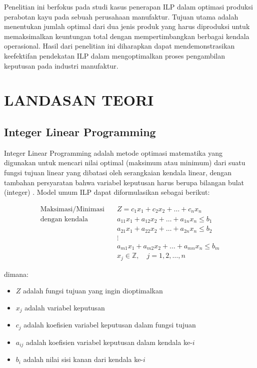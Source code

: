 \documentclass[twocolumn]{article}
\begin{document}
Penelitian ini berfokus pada studi kasus penerapan ILP dalam optimasi produksi perabotan kayu pada sebuah perusahaan manufaktur. Tujuan utama adalah menentukan jumlah optimal dari dua jenis produk yang harus diproduksi untuk memaksimalkan keuntungan total dengan mempertimbangkan berbagai kendala operasional. Hasil dari penelitian ini diharapkan dapat mendemonstrasikan keefektifan pendekatan ILP dalam mengoptimalkan proses pengambilan keputusan pada industri manufaktur.

\section{LANDASAN TEORI}
\subsection{Integer Linear Programming}
Integer Linear Programming adalah metode optimasi matematika yang digunakan untuk mencari nilai optimal (maksimum atau minimum) dari suatu fungsi tujuan linear yang dibatasi oleh serangkaian kendala linear, dengan tambahan persyaratan bahwa variabel keputusan harus berupa bilangan bulat (integer) \cite{hillier2012introduction}. Model umum ILP dapat diformulasikan sebagai berikut:

\begin{align}
\text{Maksimasi/Minimasi} \quad & Z = c_1x_1 + c_2x_2 + \ldots + c_nx_n \\
\text{dengan kendala} \quad & a_{11}x_1 + a_{12}x_2 + \ldots + a_{1n}x_n \leq b_1 \\
& a_{21}x_1 + a_{22}x_2 + \ldots + a_{2n}x_n \leq b_2 \\
& \vdots \\
& a_{m1}x_1 + a_{m2}x_2 + \ldots + a_{mn}x_n \leq b_m \\
& x_j \in \mathbb{Z}, \quad j = 1, 2, \ldots, n
\end{align}

dimana:
\begin{itemize}
    \item $Z$ adalah fungsi tujuan yang ingin dioptimalkan
    \item $x_j$ adalah variabel keputusan
    \item $c_j$ adalah koefisien variabel keputusan dalam fungsi tujuan
    \item $a_{ij}$ adalah koefisien variabel keputusan dalam kendala ke-$i$
    \item $b_i$ adalah nilai sisi kanan dari kendala ke-$i$
\end{itemize}
\end{document}
